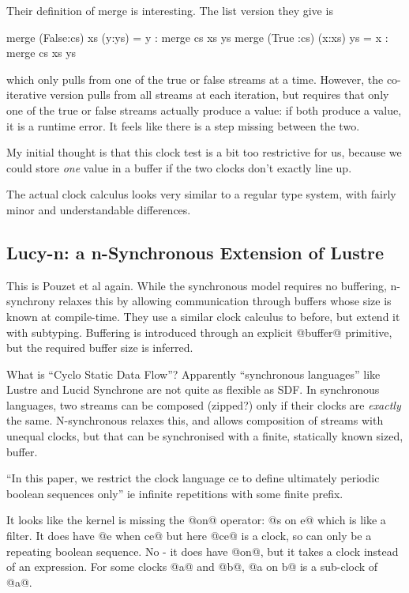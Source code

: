 Their definition of merge is interesting. The list version they give is
\begin{code}
merge (False:cs) xs (y:ys) = y : merge cs xs ys
merge (True :cs) (x:xs) ys = x : merge cs xs ys
\end{code}
which only pulls from one of the true or false streams at a time.
However, the co-iterative version pulls from all streams at each iteration, but requires that only one of the true or false streams actually produce a value: if both produce a value, it is a runtime error.
It feels like there is a step missing between the two.

My initial thought is that this clock test is a bit too restrictive for us, because we could store \emph{one} value in a buffer if the two clocks don't exactly line up.

The actual clock calculus looks very similar to a regular type system, with fairly minor and understandable differences.


\subsection{Lucy-n: a n-Synchronous Extension of Lustre}
This is Pouzet et al again\cite{mandel2010lucy}.
While the synchronous model requires no buffering, n-synchrony relaxes this by allowing communication through buffers whose size is known at compile-time.
They use a similar clock calculus to before, but extend it with subtyping. Buffering is introduced through an explicit @buffer@ primitive, but the required buffer size is inferred.


What is ``Cyclo Static Data Flow''?
Apparently ``synchronous languages'' like Lustre and Lucid Synchrone are not quite as flexible as SDF.
In synchronous languages, two streams can be composed (zipped?) only if their clocks are \emph{exactly} the same. 
N-synchronous relaxes this, and allows composition of streams with unequal clocks, but that can be synchronised with a finite, statically known sized, buffer.

``In this paper, we restrict the clock language ce to define ultimately periodic boolean sequences only''
ie infinite repetitions with some finite prefix.

It looks like the kernel is missing the @on@ operator: @s on e@ which is like a filter. It does have @e when ce@ but here @ce@ is a clock, so can only be a repeating boolean sequence. No - it does have @on@, but it takes a clock instead of an expression.
For some clocks @a@ and @b@, @a on b@ is a sub-clock of @a@.

